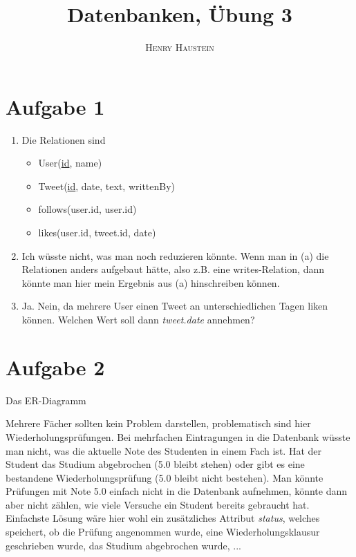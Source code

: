 \documentclass{article}
\title{\textbf{Datenbanken, Übung 3}}
\author{\textsc{Henry Haustein}}
\date{}
\begin{document}
	\maketitle
	
	\section*{Aufgabe 1}
	\begin{enumerate}[label=(\alph*)]
		\item Die Relationen sind
		\begin{itemize}
			\item User(\underline{id}, name)
			\item Tweet(\underline{id}, date, text, writtenBy)
			\item follows(user.id, user.id)
			\item likes(user.id, tweet.id, date)
		\end{itemize}
		\item Ich wüsste nicht, was man noch reduzieren könnte. Wenn man in (a) die Relationen anders aufgebaut hätte, also z.B. eine writes-Relation, dann könnte man hier mein Ergebnis aus (a) hinschreiben können.
		\item Ja. Nein, da mehrere User einen Tweet an unterschiedlichen Tagen liken können. Welchen Wert soll dann \textit{tweet.date} annehmen?
	\end{enumerate}

	\section*{Aufgabe 2}
	Das ER-Diagramm
	\begin{center}
	\end{center}
	Mehrere Fächer sollten kein Problem darstellen, problematisch sind hier Wiederholungsprüfungen. Bei mehrfachen Eintragungen in die Datenbank wüsste man nicht, was die aktuelle Note des Studenten in einem Fach ist. Hat der Student das Studium abgebrochen (5.0 bleibt stehen) oder gibt es eine bestandene Wiederholungsprüfung (5.0 bleibt nicht bestehen). Man könnte Prüfungen mit Note 5.0 einfach nicht in die Datenbank aufnehmen, könnte dann aber nicht zählen, wie viele Versuche ein Student bereits gebraucht hat. Einfachste Lösung wäre hier wohl ein zusätzliches Attribut \textit{status}, welches speichert, ob die Prüfung angenommen wurde, eine Wiederholungsklausur geschrieben wurde, das Studium abgebrochen wurde, ...
\end{document}
